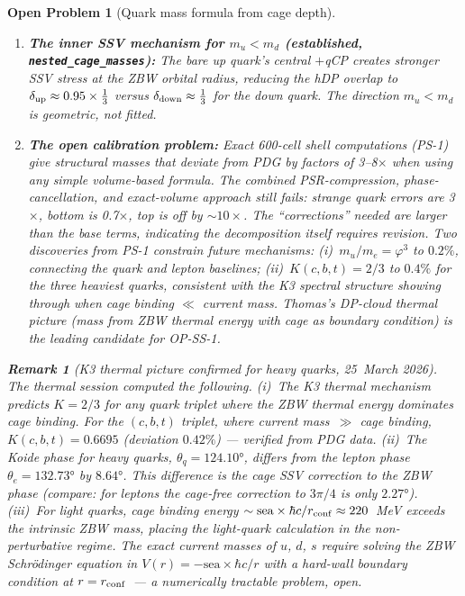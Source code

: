 \documentclass[11pt,letterpaper]{article}
\newtheorem{remark}[theorem]{Remark}
\newtheorem{openprob}[theorem]{Open Problem}
\newcommand{\phig}{\varphi}
\begin{document}
\begin{openprob}[Quark mass formula from cage depth]
\begin{enumerate}
\item \textbf{The inner SSV mechanism for $m_u < m_d$
  (established, \texttt{nested\_cage\_masses}):}
  The bare up quark's central $+$qCP creates stronger SSV stress
  at the ZBW orbital radius, reducing the hDP overlap to
  $\delta_{\rm up} \approx 0.95 \times \frac{1}{3}$ versus
  $\delta_{\rm down} \approx \frac{1}{3}$ for the down quark.
  The direction $m_u < m_d$ is geometric, not fitted.

\item \textbf{The open calibration problem:}
  Exact 600-cell shell computations (PS-1) give structural masses
  that deviate from PDG by factors of 3--8$\times$ when using any
  simple volume-based formula.  The combined PSR-compression,
  phase-cancellation, and exact-volume approach still fails:
  strange quark errors are 3$\times$, bottom is 0.7$\times$,
  top is off by $\sim 10\times$.  The ``corrections'' needed
  are larger than the base terms, indicating the decomposition
  itself requires revision.  Two discoveries from PS-1 constrain
  future mechanisms: (i)~$m_u/m_e = \phig^3$ to $0.2\%$,
  connecting the quark and lepton baselines; (ii)~$K(c,b,t)
  = 2/3$ to $0.4\%$ for the three heaviest quarks, consistent
  with the K3 spectral structure showing through when cage
  binding $\ll$ current mass.  Thomas's DP-cloud thermal picture
  (mass from ZBW thermal energy with cage as boundary condition)
  is the leading candidate for OP-SS-1.
\end{enumerate}

\begin{remark}[K3 thermal picture confirmed for heavy quarks, 25~March 2026]
The thermal session computed the following.
(i)~The K3 thermal mechanism predicts $K = 2/3$ for any quark triplet
where the ZBW thermal energy dominates cage binding.
For the $(c,b,t)$ triplet, where current mass~$\gg$ cage binding,
$K(c,b,t) = 0.6695$ (deviation $0.42\%$) --- verified from PDG data.
(ii)~The Koide phase for heavy quarks, $\theta_q = 124.10°$,
differs from the lepton phase $\theta_e = 132.73°$ by $8.64°$.
This difference is the cage SSV correction to the ZBW phase
(compare: for leptons the cage-free correction to $3\pi/4$
is only $2.27°$).
(iii)~For light quarks, cage binding energy
$\sim \text{sea}\times\hbar c/r_{\rm conf} \approx 220$~MeV
exceeds the intrinsic ZBW mass, placing the light-quark calculation
in the non-perturbative regime.
The exact current masses of $u$, $d$, $s$ require solving the
ZBW Schrödinger equation in $V(r) = -\text{sea}\times\hbar c/r$
with a hard-wall boundary condition at $r = r_{\rm conf}$~---
a numerically tractable problem, open.
\end{remark}


\end{openprob}
\end{document}

